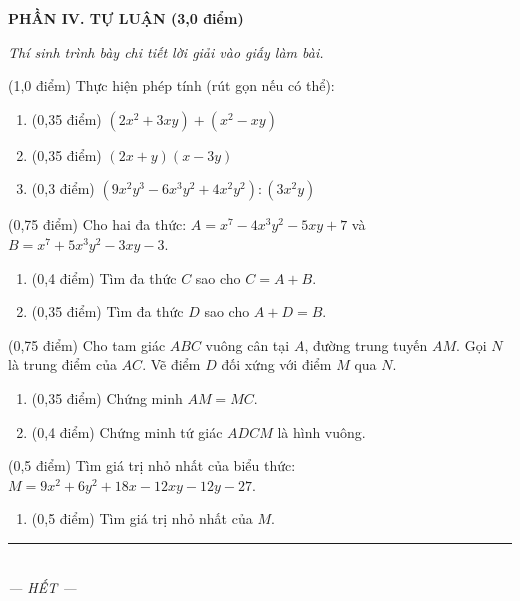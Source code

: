 \documentclass[12pt,a4paper]{article}
\begin{document}
\setcounter{ex}{0}
\noindent\textbf{\large PHẦN IV. TỰ LUẬN (3,0 điểm)}

\textit{Thí sinh trình bày chi tiết lời giải vào giấy làm bài.}

\vspace{1mm}
\begin{ex} (1,0 điểm)
Thực hiện phép tính (rút gọn nếu có thể):
\begin{enumerate}[label=\textbf{\alph*)}, leftmargin=0.8cm, itemsep=2pt]
\item (0,35 điểm) $(2x^2 + 3xy) + (x^2 - xy)$
\item (0,35 điểm) $(2x + y)(x - 3y)$
\item (0,3 điểm) $(9x^2y^3 - 6x^3y^2 + 4x^2y^2) : (3x^2y)$
\end{enumerate}
\end{ex}
\vspace{0.5mm}

\begin{ex} (0,75 điểm)
Cho hai đa thức: $A = x^7 - 4x^3y^2 - 5xy + 7$ và $B = x^7 + 5x^3y^2 - 3xy - 3$.
\begin{enumerate}[label=\textbf{\alph*)}, leftmargin=0.8cm, itemsep=2pt]
\item (0,4 điểm) Tìm đa thức $C$ sao cho $C = A + B$.
\item (0,35 điểm) Tìm đa thức $D$ sao cho $A + D = B$.
\end{enumerate}
\end{ex}
\vspace{0.5mm}

\begin{ex} (0,75 điểm)
Cho tam giác $ABC$ vuông cân tại $A$, đường trung tuyến $AM$. Gọi $N$ là trung điểm của $AC$. Vẽ điểm $D$ đối xứng với điểm $M$ qua $N$.
\begin{enumerate}[label=\textbf{\alph*)}, leftmargin=0.8cm, itemsep=2pt]
\item (0,35 điểm) Chứng minh $AM = MC$.
\item (0,4 điểm) Chứng minh tứ giác $ADCM$ là hình vuông.
\end{enumerate}
\end{ex}
\vspace{0.5mm}

\begin{ex} (0,5 điểm)
Tìm giá trị nhỏ nhất của biểu thức: $M = 9x^2 + 6y^2 + 18x - 12xy - 12y - 27$.
\begin{enumerate}[label=\textbf{\alph*)}, leftmargin=0.8cm, itemsep=2pt]
\item (0,5 điểm) Tìm giá trị nhỏ nhất của $M$.
\end{enumerate}
\end{ex}
\vspace{0.5mm}


\begin{center}
\rule{4cm}{0.4pt}\\
\textit{--- HẾT ---}
\end{center}
\end{document}
